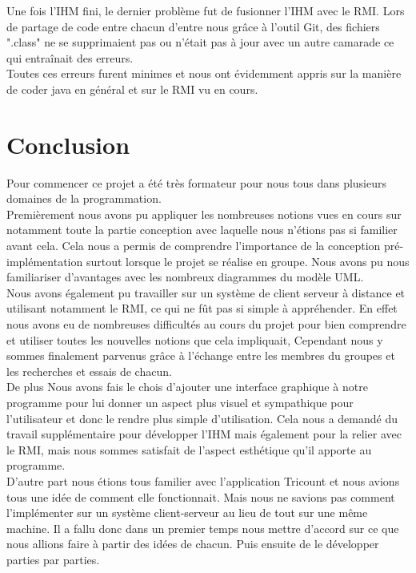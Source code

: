 \documentclass[12,french]{report}
\begin{document}
Une fois l'IHM fini, le dernier problème fut de fusionner l'IHM avec le RMI. Lors de partage de code entre chacun d'entre nous grâce à l'outil Git, des fichiers ".class" ne se supprimaient pas ou n'était pas à jour avec un autre camarade ce qui entraînait des erreurs.\\

Toutes ces erreurs furent minimes et nous ont évidemment appris sur la manière de coder java en général et sur le RMI vu en cours.


\chapter*{Conclusion}

Pour commencer ce projet a été très formateur pour nous tous dans plusieurs domaines de la programmation.\\
Premièrement nous avons pu appliquer les nombreuses notions vues en cours sur notamment toute la partie conception avec laquelle nous n'étions pas si familier avant cela. Cela nous a permis de comprendre l'importance de la conception pré-implémentation surtout lorsque le projet se réalise en groupe. Nous avons pu nous familiariser d'avantages avec les nombreux diagrammes du modèle UML.\\
Nous avons également pu travailler sur un système de client serveur à distance et utilisant notamment le RMI, ce qui ne fût pas si simple à appréhender. En effet nous avons eu de nombreuses difficultés au cours du projet pour bien comprendre et utiliser toutes les nouvelles notions que cela impliquait, Cependant nous y sommes finalement parvenus grâce à l'échange entre les membres du groupes et les recherches et essais de chacun.\\
De plus Nous avons fais le chois d'ajouter une interface graphique à notre programme pour lui donner un aspect plus visuel et sympathique pour l'utilisateur et donc le rendre plus simple d'utilisation. Cela nous a demandé du travail supplémentaire pour développer l'IHM mais également pour la relier avec le RMI, mais nous sommes satisfait de l'aspect esthétique qu'il apporte au programme.\\

D'autre part nous étions tous familier avec l'application Tricount et nous avions tous une idée de comment elle fonctionnait. Mais nous ne savions pas comment l'implémenter sur un système client-serveur au lieu de tout sur une même machine. Il a fallu donc dans un premier temps nous mettre d'accord sur ce que nous allions faire à partir des idées de chacun. Puis ensuite de le développer parties par parties.\\
\end{document}
